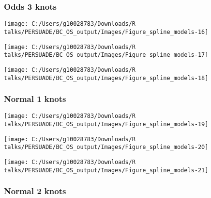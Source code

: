 \documentclass[
]{article}
\begin{document}
\clearpage

\subsubsection{Odds 3 knots}\label{odds-3-knots}

\begin{flushleft}\texttt{[image: C:/Users/g10028783/Downloads/R talks/PERSUADE/BC\_OS\_output/Images/Figure\_spline\_models-16]} \end{flushleft}

\begin{flushleft}\texttt{[image: C:/Users/g10028783/Downloads/R talks/PERSUADE/BC\_OS\_output/Images/Figure\_spline\_models-17]} \end{flushleft}

\begin{flushleft}\texttt{[image: C:/Users/g10028783/Downloads/R talks/PERSUADE/BC\_OS\_output/Images/Figure\_spline\_models-18]} \end{flushleft}

\clearpage

\subsubsection{Normal 1 knots}\label{normal-1-knots}

\begin{flushleft}\texttt{[image: C:/Users/g10028783/Downloads/R talks/PERSUADE/BC\_OS\_output/Images/Figure\_spline\_models-19]} \end{flushleft}

\begin{flushleft}\texttt{[image: C:/Users/g10028783/Downloads/R talks/PERSUADE/BC\_OS\_output/Images/Figure\_spline\_models-20]} \end{flushleft}

\begin{flushleft}\texttt{[image: C:/Users/g10028783/Downloads/R talks/PERSUADE/BC\_OS\_output/Images/Figure\_spline\_models-21]} \end{flushleft}

\clearpage

\subsubsection{Normal 2 knots}\label{normal-2-knots}
\end{document}
